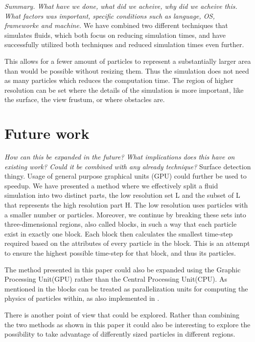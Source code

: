 \documentclass[../../main.tex]{subfiles}
\begin{document}

\textit{Summary. What have we done, what did we acheive, why did we acheive this. What factors was important, specific conditions such as language, OS, frameworke and machine.}
We have combined two different techniques that simulates fluids, which both focus on reducing simulation times, and have successfully utilized both techniques and reduced simulation times even further.

This allows for a fewer amount of particles to represent a substantially larger area than would be possible without resizing them. Thus the simulation does not need as many particles which reduces the computation time. The region of higher resolution can be set where the details of the simulation is more important, like the surface, the view frustum, or where obstacles are.


\section{Future work}
\textit{How can this be expanded in the future? What implications does this have on existing work? Could it be combined with any already technique?}
Surface detection thingy. 
Usage of general purpose graphical units (GPU) could further be used to speedup. 
We have presented a method where we effectively split a fluid simulation into two distinct parts, the low resolution set L and the subset of L that represents the high resolution part H. The low resolution uses particles with a smaller number or particles.
Moreover, we continue by breaking these sets into three-dimensional regions, also called blocks, in such a way that each particle exist in exactly one block. Each block then calculates the smallest time-step required based on the attributes of every particle in the block. This is an attempt to ensure the highest possible time-step for that block, and thus its particles. 

The method presented in this paper could also be expanded using the Graphic Processing Unit(GPU) rather than the Central Processing Unit(CPU). As mentioned in \cite{goswami2014regional} the blocks can be treated as parallelization units for computing the physics of particles within, as also implemented in \cite{goswami2010interactive}.

There is another point of view that could be explored. Rather than combining the two methods as shown in this paper it could also be interesting to explore the possibility to take advantage of differently sized particles in different regions.
\end{document}
